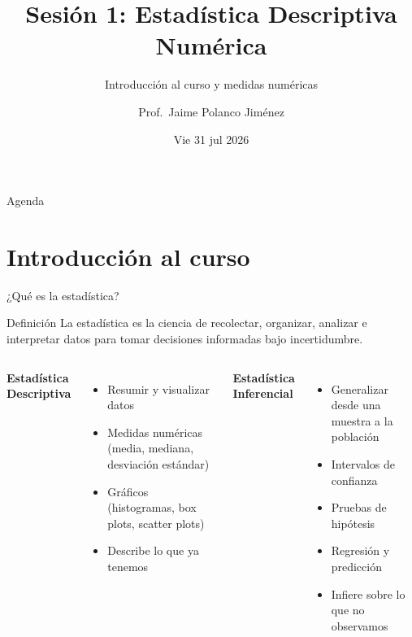 \documentclass[aspectratio=169, 11pt]{beamer}
\title{Sesión 1: Estadística Descriptiva Numérica}
\subtitle{Introducción al curso y medidas numéricas}
\author{Prof.\ Jaime Polanco Jim\'enez}
\date{Vie 31 jul 2026}
\begin{document}
\begin{frame}
\titlepage
\end{frame}

\begin{frame}{Agenda}
\tableofcontents
\end{frame}

\section{Introducción al curso}

\begin{frame}{¿Qué es la estadística?}
\begin{block}{Definición}
La estadística es la ciencia de recolectar, organizar, analizar e interpretar datos para tomar decisiones informadas bajo incertidumbre.
\end{block}

\vspace{0.5em}
\begin{columns}[T]
\textbf{Estadística Descriptiva}
\begin{itemize}
\item Resumir y visualizar datos
\item Medidas numéricas (media, mediana, desviación estándar)
\item Gráficos (histogramas, box plots, scatter plots)
\item \alert{Describe lo que ya tenemos}
\end{itemize}

\textbf{Estadística Inferencial}
\begin{itemize}
\item Generalizar desde una muestra a la población
\item Intervalos de confianza
\item Pruebas de hipótesis
\item Regresión y predicción
\item \alert{Infiere sobre lo que no observamos}
\end{itemize}
\end{columns}
\end{frame}
\end{document}
